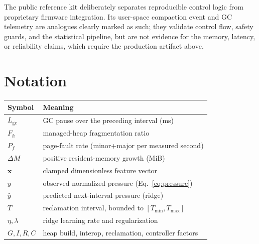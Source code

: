 \documentclass[acmsmall,screen]{acmart}
\begin{document}
The public reference kit deliberately separates reproducible control logic
from proprietary firmware integration. Its user-space compaction event and GC
telemetry are analogues clearly marked as such; they validate control flow,
safety guards, and the statistical pipeline, but are not evidence for the
memory, latency, or reliability claims, which require the production artifact
above.

\section{Notation}
\label{app:notation}

\begin{table}[h]
  \small
  \begin{tabular}{@{}ll@{}}
    \toprule
    \textbf{Symbol} & \textbf{Meaning} \\
    \midrule
    $L_{\mathrm{gc}}$ & GC pause over the preceding interval (ms) \\
    $F_h$ & managed-heap fragmentation ratio \\
    $P_f$ & page-fault rate (minor+major per measured second) \\
    $\Delta M$ & positive resident-memory growth (MiB) \\
    $\mathbf{x}$ & clamped dimensionless feature vector \\
    $y$ & observed normalized pressure (Eq.~\ref{eq:pressure}) \\
    $\hat{y}$ & predicted next-interval pressure (ridge) \\
    $T$ & reclamation interval, bounded to $[T_{\min},T_{\max}]$ \\
    $\eta,\lambda$ & ridge learning rate and regularization \\
    $G,I,R,C$ & heap build, interop, reclamation, controller factors \\
    \bottomrule
  \end{tabular}
\end{table}
\end{document}
